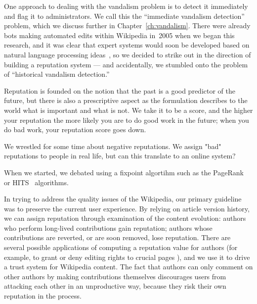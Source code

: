 One approach to dealing with the vandalism problem is to detect
it immediately and flag it to administrators.
We call this the ``immediate vandalism detection'' problem,
which we discuss further in Chapter~\ref{ch:vandalism}.
There were already bots making automated edits within Wikipedia
in~2005 when we began this research, and it was clear that
expert systems would soon be developed based on natural language processing
ideas~\cite{wiki:AntiVandalBot,wiki:MartinBot,wiki:ClueBot,Carter2007},
so we decided to strike out in the direction of building a reputation system
--- and accidentally, we stumbled onto the problem of
``historical vandalism detection.''


Reputation is founded on the notion that the past is a good
predictor of the future, but there is also a prescriptive aspect
as the formulation describes to the world what is important and
what is not.
We take it to be a score, and the higher your reputation the more
likely you are to do good work in the future; when you do bad
work, your reputation score goes down.

We wrestled for some time about negative reputations. We assign "bad"
reputations to people in real life, but can this translate to an online
system?  


When we started, we debated using a fixpoint algortihm
such as the PageRank~\cite{Page1999} or HITS~\cite{Kleinberg99}
algorithms.

In trying to address the quality issues of the Wikipedia,
our primary guideline was to preserve the current user experience.
By relying on article version history, we can assign reputation
through examination of the content evolution:
authors who perform long-lived contributions gain reputation; authors
whose contributions are reverted, or are soon removed, lose reputation.
There are several possible applications of computing a reputation
value for authors (for example, to grant or deny editing rights to
crucial pages \cite{Blaze96}), and we use it to drive a trust system for
Wikipedia content.
The fact that authors can only comment on other authors by
making contributions themselves discourages users from attacking
each other in an unproductive way, because they risk their own reputation in the process.


